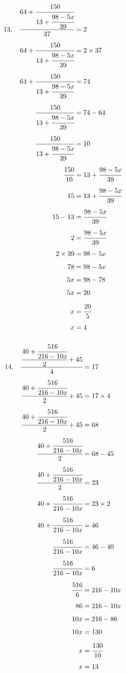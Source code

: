 \documentclass{article}
\begin{document}
\noindent
\begin{minipage}[t]{0.5000\textwidth}
\begin{align*}
13.\hspace{10pt}\cfrac{64+\cfrac{150}{13+\cfrac{98-5x}{39}}}{37}&=2\\[4pt]
64+\cfrac{150}{13+\cfrac{98-5x}{39}}&=2\times37\\[4pt]
64+\cfrac{150}{13+\cfrac{98-5x}{39}}&=74\\[4pt]
\cfrac{150}{13+\cfrac{98-5x}{39}}&=74-64\\[4pt]
\cfrac{150}{13+\cfrac{98-5x}{39}}&=10\\[4pt]
\cfrac{150}{10}&=13+\cfrac{98-5x}{39}\\[4pt]
15&=13+\cfrac{98-5x}{39}\\[4pt]
15-13&=\cfrac{98-5x}{39}\\[4pt]
2&=\cfrac{98-5x}{39}\\[4pt]
2\times39&=98-5x\\[4pt]
78&=98-5x\\[4pt]
5x&=98-78\\[4pt]
5x&=20\\[4pt]
x&=\cfrac{20}{5}\\[4pt]
x&=4\\[4pt]
\end{align*}
\end{minipage}
\begin{minipage}[t]{0.5000\textwidth}
\begin{align*}
14.\hspace{10pt}\cfrac{\cfrac{40+\cfrac{516}{216-10x}}{2}+45}{4}&=17\\[4pt]
\cfrac{40+\cfrac{516}{216-10x}}{2}+45&=17\times4\\[4pt]
\cfrac{40+\cfrac{516}{216-10x}}{2}+45&=68\\[4pt]
\cfrac{40+\cfrac{516}{216-10x}}{2}&=68-45\\[4pt]
\cfrac{40+\cfrac{516}{216-10x}}{2}&=23\\[4pt]
40+\cfrac{516}{216-10x}&=23\times2\\[4pt]
40+\cfrac{516}{216-10x}&=46\\[4pt]
\cfrac{516}{216-10x}&=46-40\\[4pt]
\cfrac{516}{216-10x}&=6\\[4pt]
\cfrac{516}{6}&=216-10x\\[4pt]
86&=216-10x\\[4pt]
10x&=216-86\\[4pt]
10x&=130\\[4pt]
x&=\cfrac{130}{10}\\[4pt]
x&=13\\[4pt]
\end{align*}
\end{minipage}
\vspace{10 mm}
\end{document}
